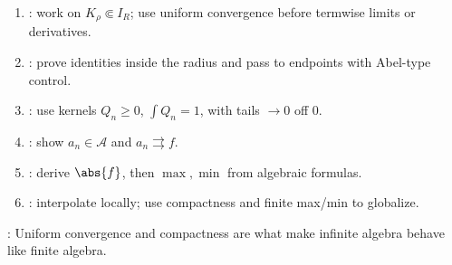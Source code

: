 \begin{method} \label{meth:power-approx-fourier-proof-patterns-source-todo}\label{meth:power-series-approximation-proof-patterns} 
\begin{enumerate}[label=(\roman*)]
\setlength{\itemsep}{0pt}
\item {}: work on $K_\rho\Subset I_R$; use uniform convergence before termwise limits or derivatives.
\item {}: prove identities inside the radius and pass to endpoints with Abel-type control.
\item {}: use kernels $Q_n\geq0$, $\int Q_n=1$, with tails $\to0$ off $0$.
\item {}: show $a_n\in\mathcal{A}$ and $a_n\rightrightarrows f$.
\item {}: derive $\abs{f}$, then $\max,\min$ from algebraic formulas.
\item {}: interpolate locally; use compactness and finite max/min to globalize.
\end{enumerate}
: Uniform convergence and compactness are what make infinite algebra behave like finite algebra.
\end{method}

